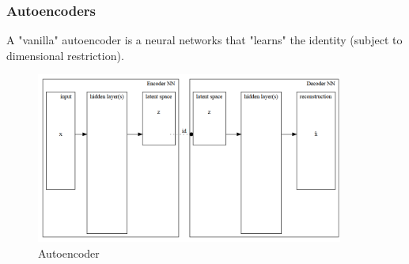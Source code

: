 \documentclass[final]{beamer}
\theoremstyle{plain}
\theoremstyle{definition}
\theoremstyle{remark}
\newcommand{\gmvae}{c$\ast$GM$\Delta$V\AE~}
\begin{document}

\begin{frame}
\frametitle{Autoencoders}
A "vanilla" autoencoder is a neural networks that "learns" the identity (subject
to dimensional restriction).

\begin{figure}[h]
\centering
\includegraphics[width=0.9\textwidth]{./plots/autoencoderNN.gv.png}
\caption{Autoencoder}
\label{fig:autoencoder}
\end{figure}

\end{frame}
\end{document}
